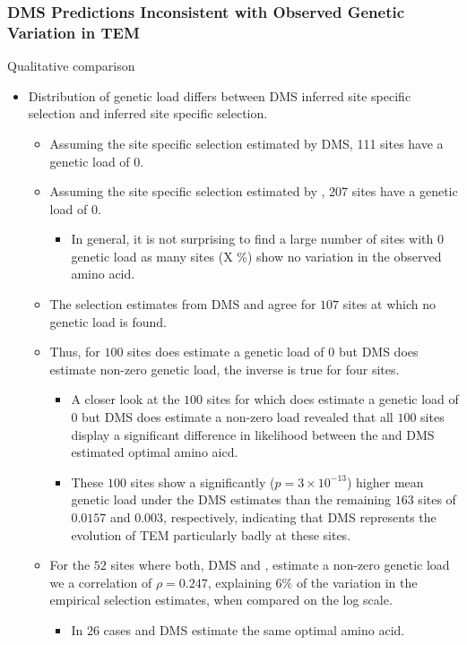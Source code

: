\documentclass[12pt]{article}
\begin{document}
\begin{itemize}
\subsubsection*{DMS Predictions Inconsistent with Observed Genetic Variation in TEM}
Qualitative comparison
\begin{itemize}
	\item Distribution of genetic load differs between DMS inferred site specific selection and \selac inferred site specific selection.
	\begin{itemize}
		\item Assuming the site specific selection estimated by DMS, 111 sites have a genetic load of 0.
		\item Assuming the site specific selection estimated by \selac, 207 sites have a genetic load of 0.
		\begin{itemize}
			\item In general, it is not surprising to find a large number of sites with 0 genetic load as many sites (X \%) show no variation in the observed amino acid.
		\end{itemize}
		\item The selection estimates from DMS and \selac agree for $107$ sites at which no genetic load is found.
		\item Thus, for $100$ sites \selac does estimate a genetic load of 0 but DMS does estimate non-zero genetic load, the inverse is true for four sites.
		\begin{itemize}
			\item A closer look at the $100$ sites for which \selac does estimate a genetic load of $0$ but DMS does estimate a non-zero load revealed that all $100$ sites display a significant difference in likelihood between the \selac and DMS estimated optimal amino aicd.
			\item These $100$ sites show a significantly ($p = 3\times10^{-13}$) higher mean genetic load under the DMS estimates than the remaining $163$ sites of $0.0157$ and $0.003$, respectively, indicating that DMS represents the evolution of TEM particularly badly at these sites.
		\end{itemize}
		\item For the $52$ sites where both, DMS and \selac, estimate a non-zero genetic load we a correlation of $\rho = 0.247$, explaining $6 \%$ of the variation in the empirical selection estimates, when compared on the log scale.
		\begin{itemize}
			\item In $26$ cases \selac and DMS estimate the same optimal amino acid.

\end{itemize}
\end{itemize}
\end{itemize}
\end{itemize}
\end{document}

